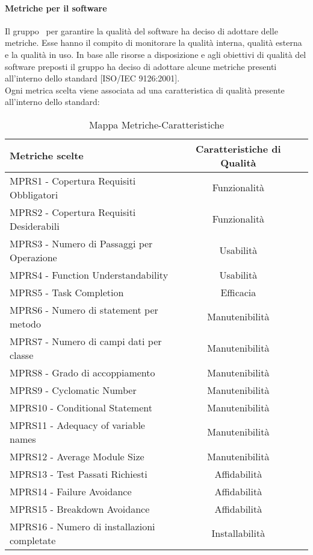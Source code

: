 \documentclass[../PianoDiQualifica.tex]{subfiles}
\begin{document}
			\paragraph{Metriche per il software}
			Il gruppo \leaf\ per garantire la qualità del software ha deciso di adottare delle metriche. Esse hanno il compito di monitorare la qualità interna, qualità esterna e la qualità in uso. In base alle risorse a disposizione e agli obiettivi di qualità del software preposti il gruppo ha deciso di adottare alcune metriche presenti all'interno dello standard [ISO/IEC 9126:2001].\\
			Ogni metrica scelta viene associata ad una caratteristica di qualità presente all'interno dello standard:
			\begin{table}[H]
				\centering
				\begin{tabular}{l * {2}{c}}
					\toprule
					\textbf{Metriche scelte} & \textbf{Caratteristiche di Qualità} \\
					\midrule
					MPRS1 - Copertura Requisiti Obbligatori & Funzionalità \\
					MPRS2 - Copertura Requisiti Desiderabili &Funzionalità\\
					MPRS3 - Numero di Passaggi per Operazione & Usabilità\\
					MPRS4 - Function Understandability & Usabilità\\
					MPRS5 - Task Completion & Efficacia \\
					MPRS6 - Numero di statement per metodo & Manutenibilità\\
					MPRS7 - Numero di campi dati per classe & Manutenibilità\\
					MPRS8 - Grado di accoppiamento & Manutenibilità\\
					MPRS9 - Cyclomatic Number & Manutenibilità\\
					MPRS10 - Conditional Statement & Manutenibilità\\
					MPRS11 - Adequacy of variable names & Manutenibilità\\
					MPRS12 - Average Module Size & Manutenibilità\\
					MPRS13 - Test Passati Richiesti & Affidabilità\\
					MPRS14 - Failure Avoidance & Affidabilità\\
					MPRS15 - Breakdown Avoidance & Affidabilità\\
					MPRS16 - Numero di installazioni completate & Installabilità\\
					\midrule
				\end{tabular}
				\caption{Mappa Metriche-Caratteristiche}
				\label{tab:mappa_metriche_caratteristice}
			\end{table}
\end{document}
